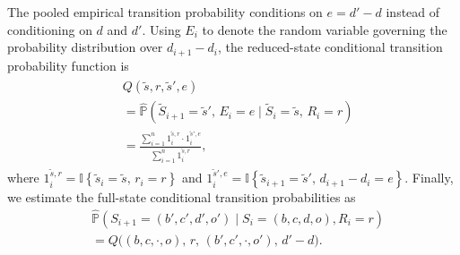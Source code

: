 \documentclass[opre,dblanonrev]{informs4}
\begin{document}
      The pooled empirical transition probability conditions on $e = d' - d$ instead of conditioning on $d$ and $d'$. Using $E_{i}$ to denote the random variable governing the probability distribution over $d_{i + 1} - d_i$, the reduced-state conditional transition probability function is
      \begin{align}
        \label{eqn:pooled-probabilities}
        \begin{split}
          &Q(\tilde s, r, \tilde s', e)\\
            &= \hat{\mathbb{P}}\left(\tilde S_{i+1} =   \tilde s',\, E_i = e \mid \tilde S_i = \tilde s,\, R_i = r\right)\\
            &= \frac
              {\sum_{i=1}^n 1_i^{\tilde s, r} \cdot 1_i^{\tilde s', e}}
              {\sum_{i=1}^n 1_i^{\tilde s, r}},
        \end{split}
      \end{align}
      where $ 1_i^{\tilde s, r}= \mathbb{I}\left\{\tilde s_i = \tilde s,\, r_i = r\right\}$ and $1_i^{\tilde s', e}= \mathbb{I}\left\{\tilde s_{i+1} = \tilde s',\, d_{i+1} - d_i = e\right\}$. Finally, we estimate the full-state conditional transition probabilities as
      \begin{align*}
        &\hat{\mathbb{P}}(S_{i+1} = (b', c', d', o') \mid S_i = (b, c, d, o), R_i = r)\\
        &= Q\big((b, c, \cdot, o),\, r,\, (b', c', \cdot, o'),\, d' - d\big).
      \end{align*}
\end{document}
